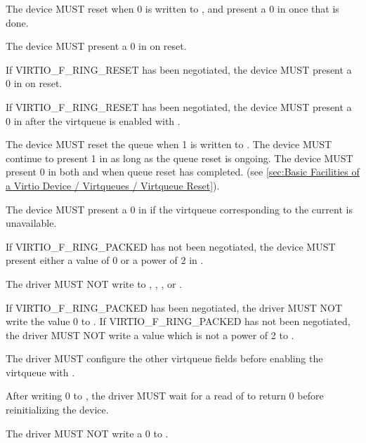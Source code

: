 The device MUST reset when 0 is written to , and
present a 0 in  once that is done.

The device MUST present a 0 in  on reset.

If VIRTIO_F_RING_RESET has been negotiated, the device MUST present a 0 in
 on reset.

If VIRTIO_F_RING_RESET has been negotiated, the device MUST present a 0 in
 after the virtqueue is enabled with .

The device MUST reset the queue when 1 is written to . The
device MUST continue to present 1 in  as long as the queue reset
is ongoing. The device MUST present 0 in both  and 
when queue reset has completed.
(see \ref{sec:Basic Facilities of a Virtio Device / Virtqueues / Virtqueue Reset}).

The device MUST present a 0 in  if the virtqueue
corresponding to the current  is unavailable.

If VIRTIO_F_RING_PACKED has not been negotiated, the device MUST
present either a value of 0 or a power of 2 in
.


The driver MUST NOT write to , , ,  or .

If VIRTIO_F_RING_PACKED has been negotiated,
the driver MUST NOT write the value 0 to .
If VIRTIO_F_RING_PACKED has not been negotiated,
the driver MUST NOT write a value which is not a power of 2 to .

The driver MUST configure the other virtqueue fields before enabling the virtqueue
with .

After writing 0 to , the driver MUST wait for a read of
 to return 0 before reinitializing the device.

The driver MUST NOT write a 0 to .

